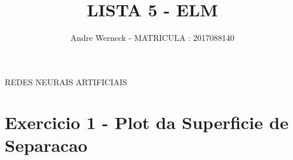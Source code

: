 \documentclass[12pt,a4paper]{article}
\title{LISTA 5 - ELM}
\author{Andre Werneck - MATRICULA : 2017088140}
\begin{document}
\maketitle

\begin{center}

REDES NEURAIS ARTIFICIAIS

\end{center}



\newpage

\section{Exercicio 1 - Plot da Superficie de Separacao}
\end{document}
